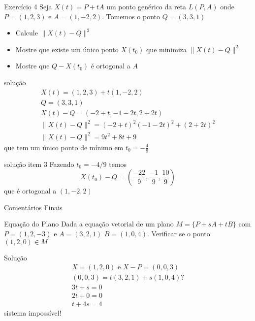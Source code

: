 \documentclass{beamer}
\begin{document}
\begin{frame}{Exercício 4}
Seja $X(t) = P + tA$ um ponto genérico da reta $L(P,A)$ onde $P=(1,2,3)$ e $A=(1,-2,2).$ Tomemos o ponto $Q=(3,3,1)$
\begin{itemize}
    \item Calcule $\| X(t) - Q \|^2$
    \item Mostre que existe um único ponto $X(t_0)$ que minimiza $\| X(t) - Q \|^2$
    \item Mostre que $Q-X(t_0)$ é ortogonal a $A$
\end{itemize}
    \end{frame}

    \begin{frame}{solução}
     \begin{gather*}
       X(t) = (1,2,3)+t(1,-2,2) \\
       Q=(3,3,1)\\
       X(t)-Q =(-2+t,-1-2t,2+2t)\\
       \|X(t)-Q\|^2 = (-2+t)^2 (-1-2t)^2+(2+2t)^2\\
       \|X(t)-Q\|^2 = 9t^2 + 8t +9
     \end{gather*} 
     que tem um único ponto de mínimo em $t_0=-\frac{4}{9}$
    \end{frame}
    \begin{frame}{solução item 3}
      Fazendo $t_0=-4/9$ temos
      $$X(t_0)-Q = (\frac{-22}{9}, \frac{-1}{9},\frac{10}{9})$$
      que é ortogonal a $(1,-2,2)$
    \end{frame}
    \begin{frame}{Comentários Finais}
      
    \end{frame} 
    \begin{frame}{Equação do Plano}
      Dada a equação vetorial de um plano $M =\{P+sA+tB\}$
      com $P=(1,2,-3)$ e $A=(3,2,1)$ $B=(1,0,4)$.
      Verificar se o ponto $(1,2,0)\in M$
      
    \end{frame}
    \begin{frame}{Solução}
      \begin{gather*}
        X=(1,2,0) \text{ e }X-P=(0,0,3) \\
        (0,0,3)= t(3,2,1) + s(1,0,4) ? \\
        3t + s =0 \\
        2t + 0 =0 \\
        t + 4s =4
      \end{gather*}
      sistema impossível!

      
    \end{frame}
\end{document}
